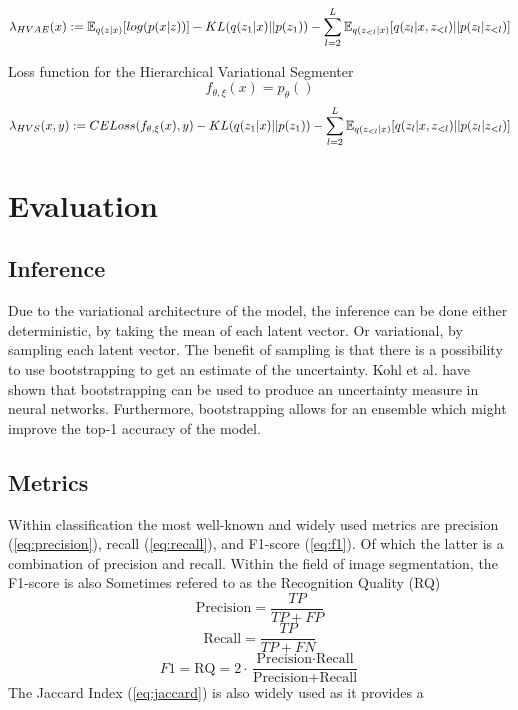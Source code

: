 \begin{equation}
    \lambda_{HVAE}(x) := \operatorname{\mathbb{E}}_{q(z|x)}[log(p(x|z))] - KL(q(z_1|x)||p(z_1)) - \sum_{l=2}^{L} \operatorname{\mathbb{E}}_{q(z_{<l} | x)}[q(z_l| x, z_{<l}) ||p(z_l|z_{<l})]
\end{equation}


Loss function for the Hierarchical Variational Segmenter
\begin{equation}
    f_{\theta, \xi}(x) = p_\theta()
\end{equation}
\begin{equation}
    \lambda_{HVS}(x, y) := CELoss(f_{\theta, \xi}(x), y) - KL(q(z_1|x)||p(z_1)) - \sum_{l=2}^{L} \operatorname{\mathbb{E}}_{q(z_{<l} | x)}[q(z_l| x, z_{<l}) ||p(z_l|z_{<l})]
\end{equation}

\section{Evaluation}

\subsection{Inference}
Due to the variational architecture of the model, the inference can be done either deterministic, by taking the mean of each latent vector. Or variational, by sampling each latent vector. The benefit of sampling is that there is a possibility to use bootstrapping to get an estimate of the uncertainty. Kohl et al. \cite{kohl2018probabilistic} have shown that bootstrapping can be used to produce an uncertainty measure in neural networks. Furthermore, bootstrapping allows for an ensemble which might improve the top-1 accuracy of the model.


\subsection{Metrics}
Within classification the most well-known and widely used metrics are precision (\ref{eq:precision}), recall (\ref{eq:recall}), and F1-score (\ref{eq:f1})\cite{rijsbergen1979information}. Of which the latter is a combination of precision and recall. Within the field of image segmentation, the F1-score is also Sometimes refered to as the Recognition Quality (RQ)
\begin{equation}
    \label{eq:precision}
    \text{Precision} = \frac{TP}{TP + FP}
\end{equation}
\begin{equation}
    \label{eq:recall}
    \text{Recall} = \frac{TP}{TP + FN}
\end{equation}
\begin{equation}
    \label{eq:f1}
    F1 = \text{RQ} = 2 \cdot \frac{\text{Precision} \cdot \text{Recall}}{\text{Precision} + \text{Recall}}
\end{equation}
The Jaccard Index (\ref{eq:jaccard}) is also widely used as it provides a 

